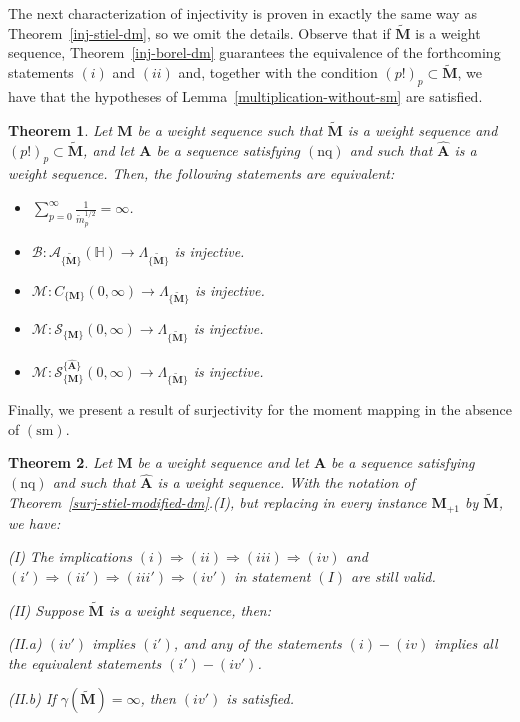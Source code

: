 \documentclass[12pt,a4paper]{article}
\newcommand{\HH}{\mathbb{H}}
\newcommand{\CM}{C_{\{\M\}}(0,\infty)}
\newcommand{\M}{{\boldsymbol{M}}}
\newcommand{\A}{{\boldsymbol{A}}}
\newcommand{\hA}{\widehat{{\boldsymbol{A}}}}
\newcommand{\nq}{\operatorname{(nq)}}
\newcommand{\sm}{\operatorname{(sm)}}
\newcommand{\ga}{\gamma}
\theoremstyle{plain}
\newtheorem{theorem}{Theorem}[section]
\theoremstyle{definition}
\numberwithin{equation}{section}
\begin{document}
The next characterization of injectivity is proven in exactly the same way as Theorem~\ref{inj-stiel-dm}, so we omit the details. Observe that if $\widetilde{\M}$ is a weight sequence, Theorem~\ref{inj-borel-dm} guarantees the equivalence of the forthcoming statements $(i)$ and $(ii)$ and, together with the condition $(p!)_p\subset\widetilde{\M}$, we have that the hypotheses of Lemma~\ref{multiplication-without-sm} are satisfied.

\begin{theorem}\label{inj-stiel-without-sm}
Let $\M$ be a weight sequence such that $\widetilde{\M}$ is a weight sequence and $(p!)_p\subset\widetilde{\M}$, and let $\A$ be a sequence satisfying $\nq$ and such that $\hA$ is a weight sequence. Then, the following statements are equivalent:
\begin{itemize}
\item[$(i)$] $\displaystyle \sum_{p = 0}^\infty \frac{1}{\widetilde{m}_p^{1/2}} = \infty$.
\item[$(ii)$] $\mathcal{B}: \mathcal{A}_{\{\widetilde{\M}\}}(\HH) \rightarrow \Lambda_{\{\widetilde{\M}\}}$ is injective.
\item[$(iii)$] $\mathcal{M}: \CM \rightarrow \Lambda_{\{\widetilde{\M}\}}$ is injective.
\item[$(iv)$] $\mathcal{M}: \mathcal{S}_{\{\M\}}(0,\infty) \rightarrow \Lambda_{\{\widetilde{\M}\}}$ is injective.
\item[$(v)$] $\mathcal{M}: \mathcal{S}^{\{\hA\}}_{\{\M\}}(0,\infty) \rightarrow \Lambda_{\{\widetilde{\M}\}}$ is injective.
\end{itemize}
\end{theorem}

\noindent Finally, we present a result of surjectivity for the moment mapping in the absence of $\sm$.

\begin{theorem}\label{surj-stiel-modified-without-sm}
Let $\M$ be a weight sequence and let $\A$ be a sequence satisfying $\nq$ and such that $\hA$ is a weight sequence. With the notation of Theorem~\ref{surj-stiel-modified-dm}.(I), but replacing in every instance $\M_{+1}$ by $\widetilde{\M}$, we have:\par\noindent
(I) The implications $(i)\Rightarrow(ii)\Rightarrow(iii)\Rightarrow(iv)$ and $(i')\Rightarrow(ii')\Rightarrow(iii')\Rightarrow(iv')$ in statement $(I)$ are still valid.\par\noindent
(II) Suppose $\widetilde{\M}$ is a weight sequence, then:\par\noindent
(II.a) $(iv')$ implies $(i')$, and any of the statements $(i)-(iv)$ implies all the equivalent statements $(i')-(iv')$.\par\noindent
(II.b) If $\ga(\widetilde{\M})=\infty$, then $(iv')$ is satisfied.
\end{theorem}
\end{document}

